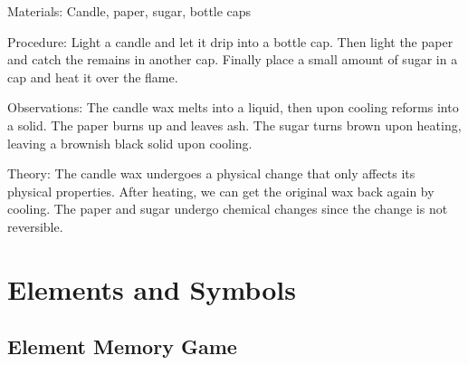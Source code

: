 \begin{multicols}{2}
\begin{description*}
\item[Materials:]{Candle, paper, sugar, bottle caps}
\item[Procedure:]{Light a candle and let it drip into a bottle cap. Then light the paper and catch the remains in another cap. Finally place a small amount of sugar in a cap and heat it over the flame.}
\item[Observations:]{The candle wax melts into a liquid, then upon cooling reforms into a solid. The paper burns up and leaves ash. The sugar turns brown upon heating, leaving a brownish black solid upon cooling.}
\item[Theory:]{The candle wax undergoes a physical change that only affects its physical properties. After heating, we can get the original wax back again by cooling. The paper and sugar undergo chemical changes since the change is not reversible.}
\end{description*}


\section*{Elements and Symbols}


\subsection{Element Memory Game} %



\end{multicols}
